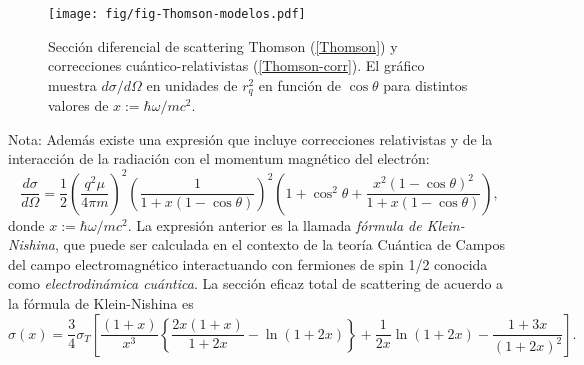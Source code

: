 \begin{figure}[!h]
\centerline{\texttt{[image: fig/fig-Thomson-modelos.pdf]}}
 \caption{Sección diferencial de scattering Thomson (\ref{Thomson}) y
correcciones cuántico-relativistas (\ref{Thomson-corr}). El gráfico muestra
${d\sigma}/{d\Omega}$ en unidades de $r_q^2$ en función de
$\cos\theta$ para distintos valores de $x:={\hbar\omega}/{mc^2}$.}
\label{thomson}
\end{figure}

Nota: Además existe una expresión que incluye correcciones relativistas y de la interacción de la radiación con el momentum magn\'{e}tico del electrón:
\begin{equation}
\frac{d\sigma }{d\Omega}=\frac{1}{2}\left(\frac{q^2\mu}{4\pi m}\right)^2
\left(  \frac{1}{1+x\left(  1-\cos
\theta\right)  }\right)  ^{2}\left(  1+\cos^{2}\theta+\frac{x^{2}\left(
1-\cos\theta\right)  ^{2}}{1+x\left(  1-\cos\theta\right)  }\right),
\end{equation}
donde $x:={\hbar\omega}/{mc^{2}}$. La expresión anterior es la llamada \textit{fórmula de Klein-Nishina}, que puede ser calculada en el contexto de la teoría Cuántica de Campos del campo electromagnético interactuando con fermiones de spin 1/2 conocida como \textit{electrodinámica cuántica}.
La sección eficaz total de scattering de acuerdo a la fórmula de Klein-Nishina es
\begin{equation}
 \sigma(x)=\frac{3}{4}\sigma_T\left[\frac{(1+x)}{x^3}\left\lbrace\frac{2x(1+x)}{1+2x}-\ln(1+2x)\right\rbrace+\frac{1}{2x}\ln(1+2x)-\frac{1+3x}{(1+2x)^2}\right].
\end{equation}



%
%



